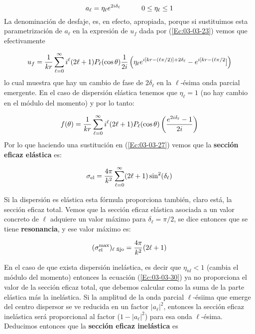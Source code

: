 \begin{equation*}
	a_\ell = \eta_\ell e^{2i\delta_\ell} \quad \quad \quad 0 \leq \eta_\ell \leq 1
\end{equation*}
La denominación de desfaje, es, en efecto, apropiada, porque si sustituimos esta parametrización de $a_\ell$ en la expresión de $u_f$ dada por (\ref{Ec:03-03-23}) vemos que efectivamente 

\begin{equation}
	u_f = \frac{1}{kr} \sum_{\ell=0}^{\infty} i^\ell (2\ell +1 ) P_\ell (\cos \theta) \frac{1}{2i} \left( \eta_\ell e^{i[kr-(\ell \pi /2)]+2\delta_\ell} - e^{i[kr-(\ell\pi/2}] \right) 
\end{equation}
lo cual muestra que hay un cambio de fase de $2\delta_\ell$ en la $\ell$-ésima onda parcial emergente. En el caso de dispersión elástica tenemos que $\eta_\ell = 1$ (no hay cambio en el módulo del momento) y por lo tanto:

\begin{equation}
	f(\theta) = \frac{1}{kr} \sum_{\ell=0}^{\infty} i^\ell (2\ell +1 ) P_\ell (\cos \theta) \left( \frac{e^{2i\delta_\ell}-1}{2i} \right)
\end{equation}
Por lo que haciendo una sustitución en (\ref{Ec:03-03-27}) vemos que la \textbf{sección eficaz elástica} es:
\begin{mybox}
	\begin{equation}
		 \sigma_{\text{el}} = \frac{4\pi}{k^2} \sum_{\ell=0}^{\infty} (2\ell +1)  \sin^2 (\delta_\ell) \label{Ec:03-03-30}
	\end{equation}
\end{mybox}

Si la dispersión es elástica esta fórmula proporciona también, claro está, la sección eficaz total. Vemos que la sección eficaz elástica asociada a un valor concreto de $\ell$ adquiere un valor máximo para $\delta_\ell = \pi/2$, se dice entonces que se tiene \textbf{resonancia}, y ese valor máximo es:

\begin{equation}
	(\sigma_{\text{el}}^{\max})_{\ell \text{ fijo}} = \frac{4\pi}{k^2} (2\ell +1)
\end{equation}

En el caso de que exista dispersión inelástica, es decir que $\eta_{nl}<1$ (cambia el módulo del momento) entonces la ecuación (\ref{Ec:03-03-30}) ya no proporciona el valor de la sección eficaz total, que debemos calcular como la suma de la parte elástica más la inelástica. Si la amplitud de la onda parcial $\ell$-ésiima que emerge del centro dispersor se ve reducida en un factor $|a_\ell|^2$, entonces la sección eficaz inelástica será proporcional al factor ($1-|a_\ell|^2$) para esa onda $\ell$-ésima. Deducimos entonces que la \textbf{sección eficaz inelástica} es

